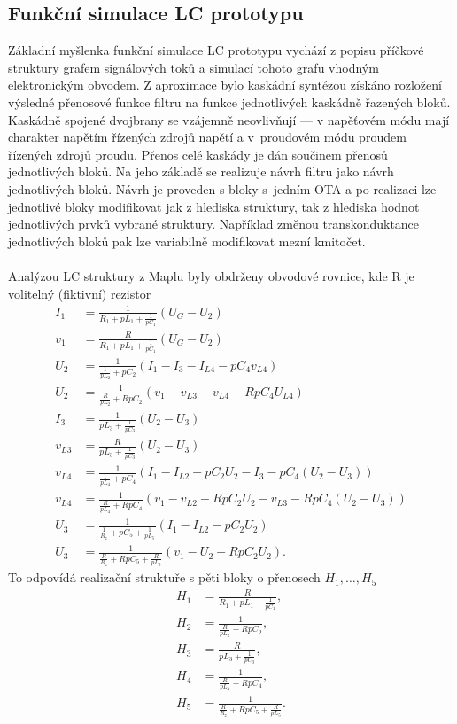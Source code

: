 \subsection{Funkční simulace LC prototypu}\label{s:KASK}
\noindent Základní myšlenka funkční simulace LC prototypu vychází z popisu příčkové struktury grafem signálových toků a simulací tohoto grafu vhodným elektronickým obvodem. Z aproximace bylo kaskádní syntézou získáno rozložení výsledné přenosové funkce filtru na funkce jednotlivých kaskádně řazených bloků. Kaskádně spojené dvojbrany se vzájemně neovlivňují --- v napěťovém módu mají charakter napětím řízených zdrojů napětí a v~proudovém módu proudem řízených zdrojů proudu. Přenos celé kaskády je dán součinem přenosů jednotlivých bloků. Na jeho základě se realizuje návrh filtru jako návrh jednotlivých bloků. Návrh je proveden s bloky s~jedním OTA a po realizaci lze jednotlivé bloky modifikovat jak z hlediska struktury, tak z hlediska hodnot jednotlivých prvků vybrané struktury. Například změnou transkonduktance jednotlivých bloků pak lze variabilně modifikovat mezní kmitočet.\\
\\
\noindent Analýzou LC struktury z Maplu byly obdrženy obvodové rovnice, kde R je volitelný (fiktivní) rezistor
\begin{align}
I_1 &= \frac{1}{R_1 + pL_1 + \frac{1}{pC_1}}(U_G - U_2)\\
v_1 & = \frac{R}{R_1 + pL_1 + \frac{1}{pC_1}}(U_G - U_2)\\
U_2 &= \frac{1}{\frac{1}{pL_2} + pC_2}(I_1 - I_{3} - I_{L4} - pC_4 v_{L4})\\
U_2 &= \frac{1}{\frac{R}{pL_2} + RpC_2}(v_1 - v_{L3} - v_{L4} - RpC_4 U_{L4})\\
I_{3} &= \frac{1}{pL_3 + \frac{1}{pC_3}}(U_2 - U_3)\\
v_{L3} &= \frac{R}{pL_3 + \frac{1}{pC_3}}(U_2 - U_3)\\
v_{L4} &= \frac{1}{\frac{1}{pL_4}+pC_4}(I_1 - I_{L2} - pC_2U_2 - I_{3} - pC_4 (U_2 - U_3))\\
v_{L4} &= \frac{1}{\frac{R}{pL_4}+RpC_4}(v_1 - v_{L2} - RpC_2U_2 - v_{L3} - RpC_4 (U_2 - U_3))\\
U_3 &= \frac{1}{\frac{1}{R_z}+pC_5 + \frac{1}{pL_5}}(I_1 - I_{L2} - pC_2U_2)\\
U_3 &= \frac{1}{\frac{R}{R_z}+RpC_5 + \frac{R}{pL_5}}(v_1 - U_2 - RpC_2 U_2).
\end{align}
\noindent To odpovídá realizační struktuře s pěti bloky o přenosech $H_1, \ldots,H_5$
\begin{align}
H_1 & = \frac{R}{R_1 + pL_1 + \frac{1}{pC_1}},\\
H_2 &= \frac{1}{\frac{R}{pL_2} + RpC_2},\\
H_3 &= \frac{R}{pL_3 + \frac{1}{pC_3}},\\
H_4 &= \frac{1}{\frac{R}{pL_4}+RpC_4},\\
H_5 &= \frac{1}{\frac{R}{R_z}+RpC_5 + \frac{R}{pL_5}}.
\end{align}
